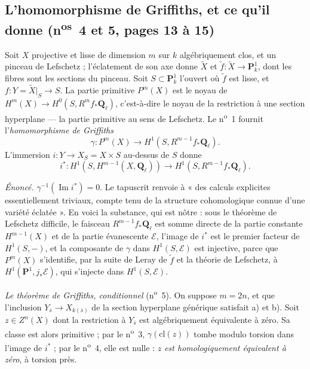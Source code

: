 \documentclass[11pt,a4paper]{article}
\begin{document}
\subsection*{L'homomorphisme de Griffiths, et ce qu'il donne (n\textsuperscript{os}~4 et 5, pages 13 à 15)}

Soit $X$ projective et lisse de dimension $m$ sur $k$ algébriquement clos, et un
pinceau de Lefschetz ; l'éclatement de son axe donne $\widetilde{X}$ et
$\tilde f\colon \widetilde{X} \to \mathbf{P}^1_k$, dont les fibres sont les
sections du pinceau. Soit $S \subset \mathbf{P}^1_k$ l'ouvert où $\tilde f$ est
lisse, et $f\colon Y = \widetilde{X}|_S \to S$. La partie primitive $P^m(X)$ est
le noyau de $H^m(X) \to H^0(S, R^mf_*\mathbf{Q}_\ell)$, c'est-à-dire le noyau de
la restriction à une section hyperplane --- la partie primitive au sens de
Lefschetz. Le n\textsuperscript{o}~1 fournit l'\emph{homomorphisme de Griffiths}
\[ \gamma\colon P^m(X) \longrightarrow H^1(S, R^{m-1}f_*\mathbf{Q}_\ell). \]
L'immersion $i\colon Y \to X_S = X \times S$ au-dessus de $S$ donne
\[ i^*\colon H^1(S, H^{m-1}(X, \mathbf{Q}_\ell)) \to H^1(S,
R^{m-1}f_*\mathbf{Q}_\ell). \]


\emph{Énoncé.} $\gamma^{-1}(\operatorname{Im} i^*) = 0$. Le tapuscrit renvoie à
« des calculs explicites essentiellement triviaux, compte tenu de la structure
cohomologique connue d'une variété éclatée ». En voici la substance, qui est
nôtre : sous le théorème de Lefschetz difficile, le faisceau $R^{m-1}f_*\mathbf{Q}_\ell$
est somme directe de la partie constante $H^{m-1}(X)$ et de la partie
évanescente $\mathcal{E}$, l'image de
$i^*$ est le premier facteur de $H^1(S, -)$, et la composante de $\gamma$ dans
$H^1(S, \mathcal{E})$ est injective, parce que $P^m(X)$ s'identifie, par la suite
de Leray de $\tilde f$ et la théorie de Lefschetz, à $H^1(\mathbf{P}^1,
j_*\mathcal{E})$, qui s'injecte dans
$H^1(S, \mathcal{E})$.

\emph{Le théorème de Griffiths, conditionnel} (n\textsuperscript{o}~5). On
suppose $m = 2n$, et que l'inclusion $Y_{\bar s} \to X_{k(\bar s)}$ de la
section hyperplane générique satisfait a) et b). Soit $z \in Z^n(X)$ dont la
restriction à $Y_{\bar s}$ est algébriquement équivalente à zéro. Sa classe est
alors primitive ; par le n\textsuperscript{o}~3, $\gamma(\mathrm{cl}(z))$ tombe
modulo torsion dans l'image de $i^*$ ; par le n\textsuperscript{o}~4, elle est
nulle : \emph{$z$ est homologiquement équivalent à zéro}, à torsion près.
\end{document}
